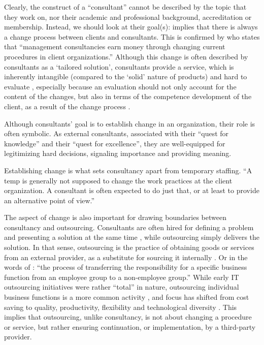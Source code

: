 \documentclass[12pt]{article}
\begin{document}
Clearly, the construct of a ``consultant'' cannot be described by the
topic that they work on, nor their academic and professional background,
accreditation or membership. Instead, we should look at their goal(s):
\citet[1]{werr1986} implies that there is always a change process
between clients and consultants. This is confirmed by
\citet[12]{kipping2000} who states that ``management consultancies earn
money through changing current procedures in client organizations.''
Although this change is often described by consultants as a `tailored
solution', consultants provide a service, which is inherently intangible
(compared to the `solid' nature of products) and hard to evaluate
\citep[ 348]{fincham1999}, especially because an evaluation should not
only account for the content of the changes, but also in terms of the
competence development of the client, as a result of the change process
\citep[ 17]{werr1986}.

Although consultants' goal is to establish change in an organization,
their role is often symbolic. As external consultants, associated with
their ``quest for knowledge'' and their ``quest for excellence'', they
are \citep[ 9-13]{pellegrin2006} well-equipped for legitimizing hard
decisions, signaling importance and providing meaning.

Establishing change is what sets consultancy apart from temporary
staffing. ``A temp is generally not supposed to change the work
practices at the client organization. A consultant is often expected to
do just that, or at least to provide an alternative point of view.''
\citep[ 5]{furusten2000}

The aspect of change is also important for drawing boundaries between
consultancy and outsourcing. Consultants are often hired for defining a
problem and presenting a solution at the same time \citep[
272]{furusten2009}, while outsourcing simply delivers the solution. In
that sense, outsourcing is the practice of obtaining goods or services
from an external provider, as a substitute for sourcing it internally
\citep[ 2]{lacity2012}. Or in the words of \citet[374]{zhu2001}: ``the
process of transferring the responsibility for a specific business
function from an employee group to a non-employee group.'' While early
IT outsourcing initiatives were rather ``total'' \citet{willcocks1995}
in nature, outsourcing individual business functions is a more common
activity \citep[ 377]{zhu2001}, and focus has shifted from cost saving
to quality, productivity, flexibility and technological diversity
\citep[ 185]{kirilov2012}. This implies that outsourcing, unlike
consultancy, is not about changing a procedure or service, but rather
ensuring continuation, or implementation, by a third-party provider.
\end{document}
